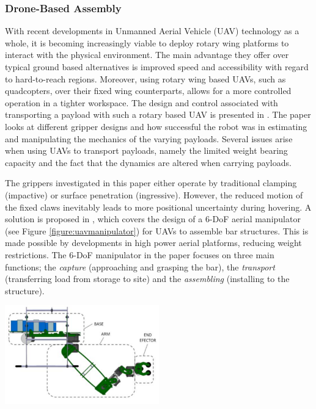 \documentclass[11pt]{article}
\begin{document}
\subsubsection{Drone-Based Assembly}
With recent developments in Unmanned Aerial Vehicle (UAV) technology as a whole, it is becoming increasingly viable to deploy rotary wing platforms to interact with the physical environment. The main advantage they offer over typical ground based alternatives is improved speed and accessibility with regard to hard-to-reach regions. Moreover, using rotary wing based UAVs, such as quadcopters, over their fixed wing counterparts, allows for a more controlled operation in a tighter workspace. The design and control associated with transporting a payload with such a rotary based UAV is presented in \cite{mellinger2011}. The paper looks at different gripper designs and how successful the robot was in estimating and manipulating the mechanics of the varying payloads. Several issues arise when using UAVs to transport payloads, namely the limited weight bearing capacity and the fact that the dynamics are altered when carrying payloads. 

The grippers investigated in this paper either operate by traditional clamping (impactive) or surface penetration (ingressive). However, the reduced motion of the fixed claws inevitably leads to more positional uncertainty during hovering. A solution is proposed in \cite{cano2013}, which covers the design of a 6-DoF aerial manipulator (see Figure \ref{figure:uavmanipulator}) for UAVs to assemble bar structures. This is made possible by developments in high power aerial platforms, reducing weight restrictions. The 6-DoF manipulator in the paper focuses on three main functions; the \textit{capture} (approaching and grasping the bar), the \textit{transport} (transferring load from storage to site) and the \textit{assembling} (installing to the structure).
\\

\begin{center}
\includegraphics[width = 0.5\textwidth]{uavmanipulator.png}
\label{figure:uavmanipulator}
\end{center}
\end{document}

